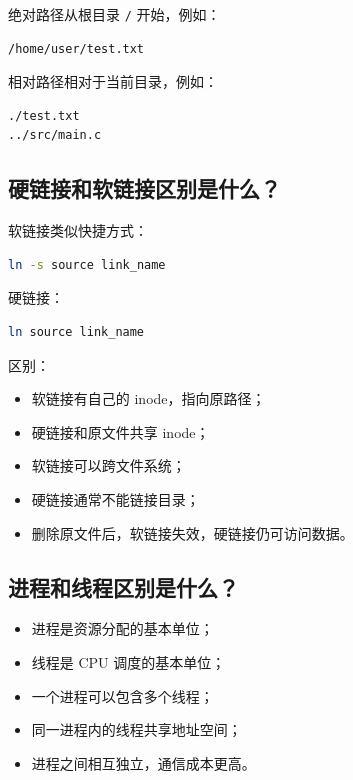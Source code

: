 \documentclass[UTF8,a4paper,12pt]{ctexart}
\begin{document}
绝对路径从根目录 \texttt{/} 开始，例如：

\begin{lstlisting}
/home/user/test.txt
\end{lstlisting}

相对路径相对于当前目录，例如：

\begin{lstlisting}
./test.txt
../src/main.c
\end{lstlisting}

\subsection{硬链接和软链接区别是什么？}

软链接类似快捷方式：

\begin{lstlisting}[language=bash]
ln -s source link_name
\end{lstlisting}

硬链接：

\begin{lstlisting}[language=bash]
ln source link_name
\end{lstlisting}

区别：
\begin{itemize}
    \item 软链接有自己的 inode，指向原路径；
    \item 硬链接和原文件共享 inode；
    \item 软链接可以跨文件系统；
    \item 硬链接通常不能链接目录；
    \item 删除原文件后，软链接失效，硬链接仍可访问数据。
\end{itemize}

\subsection{进程和线程区别是什么？}

\begin{itemize}
    \item 进程是资源分配的基本单位；
    \item 线程是 CPU 调度的基本单位；
    \item 一个进程可以包含多个线程；
    \item 同一进程内的线程共享地址空间；
    \item 进程之间相互独立，通信成本更高。
\end{itemize}
\end{document}
